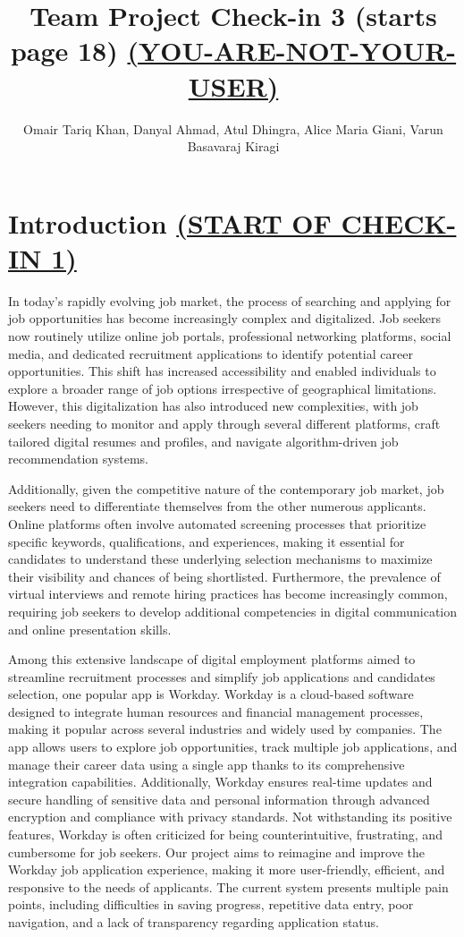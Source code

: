 \documentclass[
	letterpaper, %
]{jdf}
\author{Omair Tariq Khan, Danyal Ahmad, Atul Dhingra, Alice Maria Giani, Varun Basavaraj Kiragi}
\title{Team Project Check-in 3 \textbf{(starts page 18)} \underline{\textbf{(YOU-ARE-NOT-YOUR-USER)}}}
\begin{document}

\maketitle
\hfill \break
\hfill \break

\section{Introduction \underline{(START OF CHECK-IN 1)}}
In today's rapidly evolving job market, the process of searching and applying for job opportunities has become increasingly complex and digitalized. Job seekers now routinely utilize online job portals, professional networking platforms, social media, and dedicated recruitment applications to identify potential career opportunities. This shift has increased accessibility and enabled individuals to explore a broader range of job options irrespective of geographical limitations. However, this digitalization has also introduced new complexities, with job seekers needing to monitor and apply through several different platforms, craft tailored digital resumes and profiles, and navigate algorithm-driven job recommendation systems.

Additionally, given the competitive nature of the contemporary job market, job seekers need to differentiate themselves from the other numerous applicants. Online platforms often involve automated screening processes that prioritize specific keywords, qualifications, and experiences, making it essential for candidates to understand these underlying selection mechanisms to maximize their visibility and chances of being shortlisted. Furthermore, the prevalence of virtual interviews and remote hiring practices has become increasingly common, requiring job seekers to develop additional competencies in digital communication and online presentation skills.

Among this extensive landscape of digital employment platforms aimed to streamline recruitment processes and simplify job applications and candidates selection, one popular app is Workday. Workday is a cloud-based software designed to integrate human resources and financial management processes, making it popular across several industries and widely used by companies. The app allows users to explore job opportunities, track multiple job applications, and manage their career data using a single app thanks to its comprehensive integration capabilities. Additionally, Workday ensures real-time updates and secure handling of sensitive data and personal information through advanced encryption and compliance with privacy standards. Not withstanding its positive features, Workday is often criticized for being counterintuitive, frustrating, and cumbersome for job seekers. Our project aims to reimagine and improve the Workday job application experience, making it more user-friendly, efficient, and responsive to the needs of applicants. The current system presents multiple pain points, including difficulties in saving progress, repetitive data entry, poor navigation, and a lack of transparency regarding application status.
\end{document}
